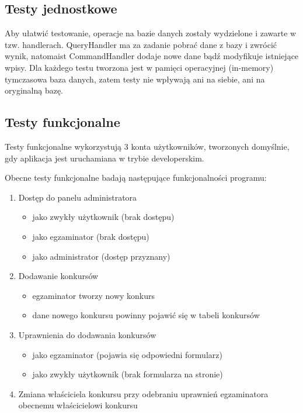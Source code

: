 \documentclass{article}
\begin{document}
\subsection{Testy jednostkowe}
Aby ułatwić testowanie, operacje na bazie danych zostały wydzielone i zawarte w tzw. handlerach. QueryHandler ma za zadanie pobrać dane z bazy i zwrócić wynik, natomaist CommandHandler dodaje nowe dane bądź modyfikuje istniejące wpisy. Dla każdego testu tworzona jest w pamięci operacyjnej (in-memory) tymczasowa baza danych, zatem testy nie wpływają ani na siebie, ani na oryginalną bazę.
\subsection{Testy funkcjonalne}
Testy funkcjonalne wykorzystują 3 konta użytkowników, tworzonych domyślnie, gdy aplikacja jest uruchamiana w trybie developerskim.

Obecne testy funkcjonalne badają następujące funkcjonalności programu:
\begin{enumerate}
    \item Dostęp do panelu administratora
    \begin{itemize}
        \item jako zwykły użytkownik (brak dostępu)
        \item jako egzaminator (brak dostępu)
        \item jako administrator (dostęp przyznany)
    \end{itemize}
    \item Dodawanie konkursów
    \begin{itemize}
        \item egzaminator tworzy nowy konkurs
        \item dane nowego konkursu powinny pojawić się w tabeli konkursów
    \end{itemize}
    \item Uprawnienia do dodawania konkursów
    \begin{itemize}
        \item jako egzaminator (pojawia się odpowiedni formularz)
        \item jako zwykły użytkownik (brak formularza na stronie)
    \end{itemize}
    \item Zmiana właściciela konkursu przy odebraniu uprawnień egzaminatora obecnemu właścicielowi konkursu
\end{enumerate}
\end{document}
